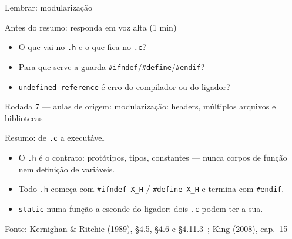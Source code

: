 \documentclass[aspectratio=169]{beamer}
\newcommand{\fonte}[1]{\vfill\hfill{\scriptsize\textcolor{UFSGray}{Fonte: #1}}}
\newcommand{\rodada}[4]{%
  \begin{frame}{Lembrar: #2}
    \begin{block}{Antes do resumo: responda em voz alta (1 min)}
      #4
    \end{block}
    \vfill
    {\small\textcolor{UFSGray}{Rodada #1 --- aulas de origem:} #3}
  \end{frame}}
\begin{document}
\rodada{7}{modularização}{modularização: headers, múltiplos arquivos e bibliotecas}{
  \begin{itemize}
    \item O que vai no \texttt{.h} e o que fica no \texttt{.c}?
    \item Para que serve a guarda \texttt{\#ifndef}/\texttt{\#define}/\texttt{\#endif}?
    \item \texttt{undefined reference} é erro do compilador ou do ligador?
  \end{itemize}}

\begin{frame}{Resumo: de \texttt{.c} a executável}
  \begin{center}
  \end{center}
  \small
  \begin{itemize}
    \item O \texttt{.h} é o contrato: protótipos, tipos, constantes --- nunca
      corpos de função nem definição de variáveis.
    \item Todo \texttt{.h} começa com \texttt{\#ifndef X\_H} / \texttt{\#define
      X\_H} e termina com \texttt{\#endif}.
    \item \texttt{static} numa função a esconde do ligador: dois
      \texttt{.c} podem ter a sua.
  \end{itemize}
  \fonte{Kernighan \& Ritchie (1989), §4.5, §4.6 e §4.11.3~\cite{kernighan1989c}; King (2008), cap.~15~\cite{king2008c}}
\end{frame}
\end{document}
